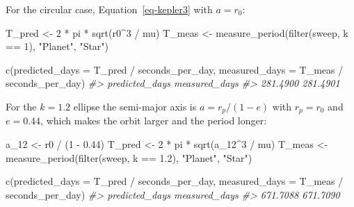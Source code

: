 \documentclass[
  10.5pt,
  letterpaper,
]{scrbook}
\newenvironment{Shaded}{\begin{snugshade}}{\end{snugshade}}
\newcommand{\AttributeTok}[1]{\textcolor[rgb]{0.00,0.00,0.00}{#1}}
\newcommand{\CommentTok}[1]{\textcolor[rgb]{0.00,0.00,0.00}{\textit{#1}}}
\newcommand{\DecValTok}[1]{\textcolor[rgb]{0.00,0.00,0.00}{#1}}
\newcommand{\FloatTok}[1]{\textcolor[rgb]{0.00,0.00,0.00}{#1}}
\newcommand{\FunctionTok}[1]{\textcolor[rgb]{0.00,0.00,0.00}{#1}}
\newcommand{\NormalTok}[1]{\textcolor[rgb]{0.00,0.00,0.00}{#1}}
\newcommand{\OtherTok}[1]{\textcolor[rgb]{0.00,0.00,0.00}{#1}}
\newcommand{\SpecialCharTok}[1]{\textcolor[rgb]{0.00,0.00,0.00}{#1}}
\newcommand{\StringTok}[1]{\textcolor[rgb]{0.00,0.00,0.00}{#1}}
\theoremstyle{definition}
\theoremstyle{plain}
\theoremstyle{remark}
\begin{document}
For the circular case, Equation~\ref{eq-kepler3} with \(a = r_0\):

\begin{Shaded}
\begin{Highlighting}[]
\NormalTok{T\_pred }\OtherTok{\textless{}{-}} \DecValTok{2} \SpecialCharTok{*}\NormalTok{ pi }\SpecialCharTok{*} \FunctionTok{sqrt}\NormalTok{(r0}\SpecialCharTok{\^{}}\DecValTok{3} \SpecialCharTok{/}\NormalTok{ mu)}
\NormalTok{T\_meas }\OtherTok{\textless{}{-}} \FunctionTok{measure\_period}\NormalTok{(}\FunctionTok{filter}\NormalTok{(sweep, k }\SpecialCharTok{==} \DecValTok{1}\NormalTok{), }\StringTok{"Planet"}\NormalTok{, }\StringTok{"Star"}\NormalTok{)}

\FunctionTok{c}\NormalTok{(}\AttributeTok{predicted\_days =}\NormalTok{ T\_pred }\SpecialCharTok{/}\NormalTok{ seconds\_per\_day,}
  \AttributeTok{measured\_days  =}\NormalTok{ T\_meas }\SpecialCharTok{/}\NormalTok{ seconds\_per\_day)}
\CommentTok{\#\textgreater{} predicted\_days  measured\_days }
\CommentTok{\#\textgreater{}       281.4900       281.4901}
\end{Highlighting}
\end{Shaded}

For the \(k = 1.2\) ellipse the semi-major axis is \(a = r_p/(1-e)\)
with \(r_p = r_0\) and \(e = 0.44\), which makes the orbit larger and
the period longer:

\begin{Shaded}
\begin{Highlighting}[]
\NormalTok{a\_12   }\OtherTok{\textless{}{-}}\NormalTok{ r0 }\SpecialCharTok{/}\NormalTok{ (}\DecValTok{1} \SpecialCharTok{{-}} \FloatTok{0.44}\NormalTok{)}
\NormalTok{T\_pred }\OtherTok{\textless{}{-}} \DecValTok{2} \SpecialCharTok{*}\NormalTok{ pi }\SpecialCharTok{*} \FunctionTok{sqrt}\NormalTok{(a\_12}\SpecialCharTok{\^{}}\DecValTok{3} \SpecialCharTok{/}\NormalTok{ mu)}
\NormalTok{T\_meas }\OtherTok{\textless{}{-}} \FunctionTok{measure\_period}\NormalTok{(}\FunctionTok{filter}\NormalTok{(sweep, k }\SpecialCharTok{==} \FloatTok{1.2}\NormalTok{), }\StringTok{"Planet"}\NormalTok{, }\StringTok{"Star"}\NormalTok{)}

\FunctionTok{c}\NormalTok{(}\AttributeTok{predicted\_days =}\NormalTok{ T\_pred }\SpecialCharTok{/}\NormalTok{ seconds\_per\_day,}
  \AttributeTok{measured\_days  =}\NormalTok{ T\_meas }\SpecialCharTok{/}\NormalTok{ seconds\_per\_day)}
\CommentTok{\#\textgreater{} predicted\_days  measured\_days }
\CommentTok{\#\textgreater{}       671.7088       671.7090}
\end{Highlighting}
\end{Shaded}
\end{document}

